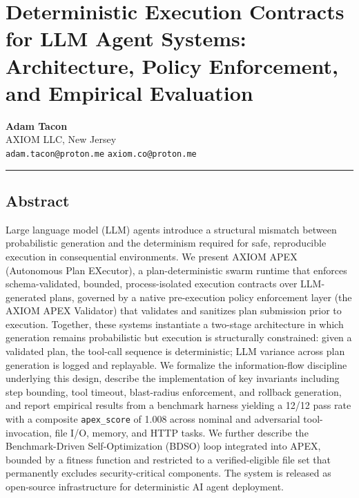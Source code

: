 \documentclass[
]{article}
\author{}
\date{}
\begin{document}
\section{Deterministic Execution Contracts for LLM Agent Systems:
Architecture, Policy Enforcement, and Empirical
Evaluation}\label{deterministic-execution-contracts-for-llm-agent-systems-architecture-policy-enforcement-and-empirical-evaluation}

\textbf{Adam Tacon}\\
AXIOM LLC, New Jersey\\
\texttt{adam.tacon@proton.me} \texttt{axiom.co@proton.me}

\begin{center}\rule{0.5\linewidth}{0.5pt}\end{center}

\subsection{Abstract}\label{abstract}

Large language model (LLM) agents introduce a structural mismatch
between probabilistic generation and the determinism required for safe,
reproducible execution in consequential environments. We present AXIOM
APEX (Autonomous Plan EXecutor), a plan-deterministic swarm runtime that
enforces schema-validated, bounded, process-isolated execution contracts
over LLM-generated plans, governed by a native pre-execution policy
enforcement layer (the AXIOM APEX Validator) that validates and sanitizes
plan submission prior to execution. Together, these systems instantiate a
two-stage architecture in which generation remains probabilistic but
execution is structurally constrained: given a validated plan, the
tool-call sequence is deterministic; LLM variance across plan generation
is logged and replayable. We formalize the information-flow discipline
underlying this design, describe the implementation of key invariants
including step bounding, tool timeout, blast-radius enforcement, and
rollback generation, and report empirical results from a benchmark
harness yielding a 12/12 pass rate with a composite \texttt{apex\_score}
of 1.008 across nominal and adversarial tool-invocation, file I/O,
memory, and HTTP tasks. We further describe the Benchmark-Driven
Self-Optimization (BDSO) loop integrated into APEX, bounded by a fitness
function and restricted to a verified-eligible file set that permanently
excludes security-critical components. The system is released as
open-source infrastructure for deterministic AI agent deployment.
\end{document}
